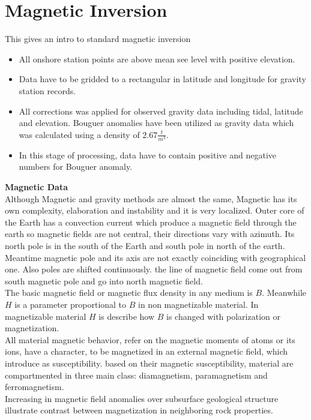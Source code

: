 \chapter{Magnetic Inversion}\label{Chp:cook:magnetic inversion}
This gives an intro to standard magnetic inversion


\begin{itemize}
\item All onshore station points are above mean see level with positive
elevation.

\item Data have to be gridded to a rectangular in latitude and longitude
for gravity station records.

\item All corrections was applied for observed gravity data including
tidal, latitude and elevation. Bouguer anomalies have been utilized as
gravity data which was calculated using a density of $2.67 \frac{t}{m^3}$.

\item In this stage of processing, data have to contain positive and
negative numbers for Bouguer anomaly.
\end{itemize}

\textbf{Magnetic Data} \\

Although Magnetic and gravity methods are almost the same, Magnetic has its own complexity, elaboration and instability and it is very localized. Outer core of the Earth has a convection current which produce a magnetic field through the earth so magnetic fields are not central, their directions vary with azimuth. Its north pole is in the south of the Earth and south pole in north of the earth. Meantime magnetic pole and its axis are not exactly coinciding with geographical one. Also poles are shifted continuously. the line of magnetic field come out from south magnetic pole and go into north magnetic field. \\

The basic magnetic field or magnetic flux density in any medium is $B$. Meanwhile $H$ is a parameter proportional to $B$ in non magnetizable material. In magnetizable material $H$ is describe how $B$ is changed with polarization or magnetization.\\
All material magnetic behavior, refer on the magnetic moments of atoms or its ions, have a character, to be magnetized in an external magnetic field, which introduce as susceptibility. based on their magnetic susceptibility, material are compartmented in three main class: diamagnetism, paramagnetism and ferromagnetism.\\
Increasing in magnetic field anomalies over subsurface geological structure illustrate contrast between magnetization in neighboring rock properties.\\

